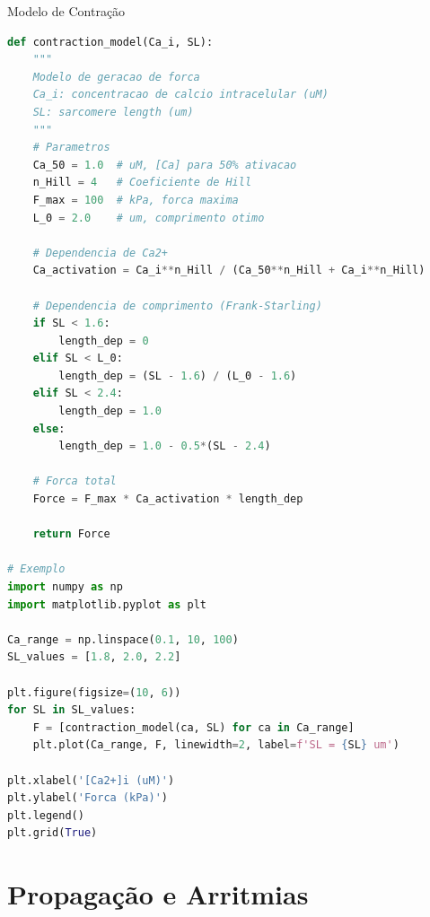 \begin{frame}[fragile]{Modelo de Contração}
\begin{lstlisting}[language=Python, caption=Modelo simplificado de contração, basicstyle=\ttfamily\footnotesize]
def contraction_model(Ca_i, SL):
    """
    Modelo de geracao de forca
    Ca_i: concentracao de calcio intracelular (uM)
    SL: sarcomere length (um)
    """
    # Parametros
    Ca_50 = 1.0  # uM, [Ca] para 50% ativacao
    n_Hill = 4   # Coeficiente de Hill
    F_max = 100  # kPa, forca maxima
    L_0 = 2.0    # um, comprimento otimo

    # Dependencia de Ca2+
    Ca_activation = Ca_i**n_Hill / (Ca_50**n_Hill + Ca_i**n_Hill)

    # Dependencia de comprimento (Frank-Starling)
    if SL < 1.6:
        length_dep = 0
    elif SL < L_0:
        length_dep = (SL - 1.6) / (L_0 - 1.6)
    elif SL < 2.4:
        length_dep = 1.0
    else:
        length_dep = 1.0 - 0.5*(SL - 2.4)

    # Forca total
    Force = F_max * Ca_activation * length_dep

    return Force

# Exemplo
import numpy as np
import matplotlib.pyplot as plt

Ca_range = np.linspace(0.1, 10, 100)
SL_values = [1.8, 2.0, 2.2]

plt.figure(figsize=(10, 6))
for SL in SL_values:
    F = [contraction_model(ca, SL) for ca in Ca_range]
    plt.plot(Ca_range, F, linewidth=2, label=f'SL = {SL} um')

plt.xlabel('[Ca2+]i (uM)')
plt.ylabel('Forca (kPa)')
plt.legend()
plt.grid(True)
\end{lstlisting}
\end{frame}

\section{Propagação e Arritmias}

